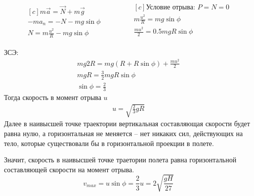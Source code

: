 \documentclass[a5paper,10pt]{article}
\begin{document}
\begin{equation*}
    \begin{aligned}[c]
        m\vec{a}=\vec{N}+m\vec{g}\\
        -ma_n=-N-mg\sin{\phi}\\
        N=m{}\frac{u^2}{R}-mg\sin\phi
    \end{aligned}
        \qquad\qquad
    \begin{aligned}[c]
        \text{Условие отрыва: $P=N=0$}\\
        m{}\frac{u^2}{R}=mg\sin\phi\\
        \frac{mu^2}{2}=0.5mgR\sin\phi\\
    \end{aligned}
\end{equation*}

ЗСЭ:
\begin{gather*}
    mg2R=mg(R+R\sin\phi)+\frac{mu^2}{2}\\
    mgR=\frac{3}{2}mgR\sin\phi\\
    \sin\phi=\frac{2}{3}
\end{gather*}
Тогда скорость в момент отрыва $u$
\begin{gather*}
    u=\sqrt{\frac{2}{3}gR}
\end{gather*}
Далее в наивысшей точке траектории вертикальная составляющая скорости будет равна нулю, а горизонтальная не меняется -- нет никаких сил, действующих на тело, которые существовали бы в горизонтальной проекции в полете.

Значит, скорость в наивысшей точке траетории полета равна горизонтальной составляющей скорости на момент отрыва.
\begin{equation*}
    v_{max}=u\sin\phi=\frac{2}{3}u=2\sqrt{\frac{gH}{27}}
\end{equation*}
\end{document}
